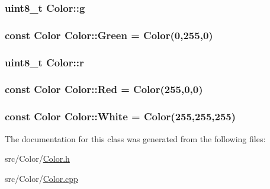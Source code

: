 \subsubsection[{\texorpdfstring{g}{g}}]{\setlength{\rightskip}{0pt plus 5cm}uint8\+\_\+t Color\+::g}\hypertarget{class_color_a23331f00b02491a901873b5085461d99}{}\label{class_color_a23331f00b02491a901873b5085461d99}
\subsubsection[{\texorpdfstring{Green}{Green}}]{\setlength{\rightskip}{0pt plus 5cm}const {\bf Color} Color\+::\+Green = {\bf Color}(0,255,0)\hspace{0.3cm}{\ttfamily [static]}}\hypertarget{class_color_a99d190056130b083fe716a721f0e2b74}{}\label{class_color_a99d190056130b083fe716a721f0e2b74}
\subsubsection[{\texorpdfstring{r}{r}}]{\setlength{\rightskip}{0pt plus 5cm}uint8\+\_\+t Color\+::r}\hypertarget{class_color_aecbc1a4121c21990512e7c10544d6ece}{}\label{class_color_aecbc1a4121c21990512e7c10544d6ece}
\subsubsection[{\texorpdfstring{Red}{Red}}]{\setlength{\rightskip}{0pt plus 5cm}const {\bf Color} Color\+::\+Red = {\bf Color}(255,0,0)\hspace{0.3cm}{\ttfamily [static]}}\hypertarget{class_color_ade25ce437fd74a7b08fee1583b329c8e}{}\label{class_color_ade25ce437fd74a7b08fee1583b329c8e}
\subsubsection[{\texorpdfstring{White}{White}}]{\setlength{\rightskip}{0pt plus 5cm}const {\bf Color} Color\+::\+White = {\bf Color}(255,255,255)\hspace{0.3cm}{\ttfamily [static]}}\hypertarget{class_color_a64abba1de9a93b7b2cf3ddbde14f640b}{}\label{class_color_a64abba1de9a93b7b2cf3ddbde14f640b}


The documentation for this class was generated from the following files\+:\begin{DoxyCompactItemize}
\item 
src/\+Color/\hyperlink{_color_8h}{Color.\+h}\item 
src/\+Color/\hyperlink{_color_8cpp}{Color.\+cpp}\end{DoxyCompactItemize}
